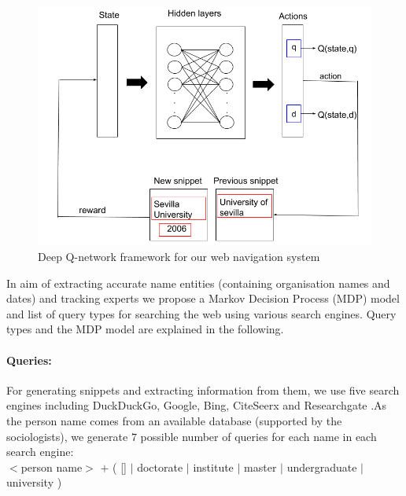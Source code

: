 
\begin{figure}[!t]
\centering
\includegraphics[scale=0.3]{./images/neural-network.png}
\caption{Deep Q-network framework for our web navigation system  }
\label{fig:naviagte}
\end{figure}

In aim of extracting accurate name entities (containing organisation names and dates) and tracking experts we propose a Markov Decision Process (MDP) model and list of query types for searching the web using various search engines. Query types and the MDP model are explained in the following.

\paragraph{Queries: }  %
For generating snippets and extracting information from them, we use five search engines including DuckDuckGo, Google, Bing, CiteSeerx and Researchgate .As the person name comes from an available database (supported by the sociologists), we generate $7$ possible number of queries for each name in each search engine: \\

$<$person name$>$ $+$ (  [] $|$ doctorate $|$ institute $|$ master $|$ undergraduate $|$ university ) 

